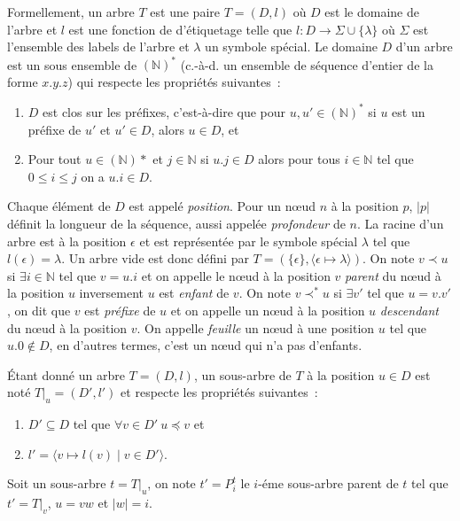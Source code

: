 \begin{definition}
    \label{def:struct:tree}
    Formellement, un arbre $T$ est une paire $T = (D, l)$ où $D$ est le domaine de l'arbre et $l$ est une fonction de d'étiquetage telle que $l : D \to \Sigma \cup \{\lambda\}$ où $\Sigma$ est l'ensemble des labels de l'arbre et $\lambda$ un symbole spécial.
    Le domaine $D$ d'un arbre est un sous ensemble de $(\mathbb{N})^*$ (c.-à-d. un ensemble de séquence d'entier de la forme $x.y.z$) qui respecte les propriétés suivantes :
    \begin{enumerate}
        \item $D$ est clos sur les préfixes, c'est-à-dire que pour $u, u' \in (\mathbb{N})^*$ si $u$ est un préfixe de $u'$ et $u' \in D$, alors $u \in D$, et
        \item Pour tout $u \in (\mathbb{N})*$ et $j \in \mathbb{N}$ si $u.j \in D$ alors pour tous $i \in \mathbb{N}$ tel que $0 \leq i \leq j$ on a $u.i \in D$.
    \end{enumerate}
    Chaque élément de $D$ est appelé \emph{position}.
    Pour un nœud $n$ à la position $p$, $|p|$ définit la longueur de la séquence, aussi appelée \emph{profondeur} de $n$.
    La racine d'un arbre est à la position $\epsilon$ et est représentée par le symbole spécial $\lambda$ tel que $l(\epsilon) = \lambda$.
    Un arbre vide est donc défini par  $T = (\{\epsilon\}, \langle \epsilon \mapsto \lambda \rangle)$.
    On note $v \prec u$ si $\exists i \in \mathbb{N}$ tel que $v = u.i$ et on appelle le nœud à la position $v$ \emph{parent} du nœud à la position $u$ inversement $u$ est \emph{enfant} de $v$.  
    On note $v \prec^* u$ si $\exists v'$ tel que $u = v.v'$, on dit que $v$ est \emph{préfixe} de $u$ et on appelle un nœud à la position $u$ \emph{descendant} du nœud à la position $v$.
    On appelle \emph{feuille} un nœud à une position $u$ tel que $u.0 \notin D$, en d'autres termes, c'est un nœud qui n'a pas d'enfants.
\end{definition}

\begin{definition}
    Étant donné un arbre $T = (D, l)$, un sous-arbre de $T$ à la position $u \in D$ est noté $T|_u = (D', l')$ et respecte les propriétés suivantes :
    \begin{enumerate}
        \item $D' \subseteq D$ tel que $\forall v \in D' ~ u \preceq v$ et
        \item $l' = \langle v \mapsto l(v) \mid v \in D' \rangle $.
    \end{enumerate}
    Soit un sous-arbre $t = T|_u$, on note $t' = P_i^t$ le $i$-éme sous-arbre parent de $t$ tel que $t' = T|_v$,  $u = vw$ et $|w| = i$.
\end{definition}

